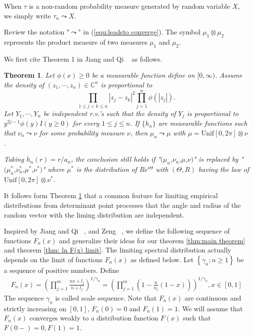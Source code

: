 \documentclass[12pt]{article}
\theoremstyle{plain}
\newtheorem{thm}{\textbf{Theorem}}
\theoremstyle{definition}
\theoremstyle{remark}
\begin{document}
When $\tau$ is a non-random probability measure generated by random variable $X$, we simply write $\tau_n\leadsto X$.

Review the notation "$\leadsto$" in (\ref{equ:leadsto converge}).
The symbol $\mu_1\otimes \mu_2$ represents the product measure of two measures $\mu_1$ and $\mu_2$.

We first cite Theorem 1 in Jiang and Qi ~\cite{JiangQi2019} as
follows.

\begin{thm}\label{thm:nonlinear}
Let $\phi(x)\geq 0$ be a measurable function define on $[0,\infty)$. Assume the density of $(z_1,\cdots,z_n)\in \mathbb{C}^n$ is proportional to $$\prod_{1\leq j<k\leq n} |z_j-z_k|^2\prod_{j=1}^n\phi (|z_j|).$$
Let $Y_1,\cdots,Y_n$ be independent r.v.'s such that the density of $Y_j$ is proportional to $y^{2j-1}\phi(y)I(y\geq 0)$ for every $1\leq j\leq n$. If $\{ h_n \}$ are measurable functions such that $\nu_n\leadsto \nu$ for some probability measure $\nu$, then $\mu_n\leadsto \mu$ with $\mu=\text{Unif}[0,2\pi]\otimes \nu$.

Taking $h_n(r)=r/a_n$, the conclusion still holds if "$(\mu_n$,$\nu_n$,$\mu$,$\nu)$" is replaced by "$(\mu_n^*$,$\nu_n^*$,$\mu^*$,$\nu^*)$" where $\mu^*$ is the distribution of $Re^{i\Theta}$ with $(\Theta,R)$ having the law of $\text{Unif}[0,2\pi]\otimes \nu^*$.
\end{thm}
It follows form Theorem \ref{thm:nonlinear} that a common feature for limiting empirical distributions from determinant point processes that the angle and radius of the random vector with the liming distribution are independent.

Inspired by Jiang and Qi ~\cite{JiangQi2019}, and Zeng
~\cite{zeng2016}, we define the following sequence of functions
$F_n(x)$ and generalize their ideas for our theorem \ref{thm:main
theorem} and theorem \ref{thm: ln F(x) limit}. The limiting spectral
distribution actually depends on the limit of functions $F_n(x)$ as
defined below. Let $\left\{\gamma_{n} ;  n \geq 1\right\}$ be a
sequence of positive numbers. Define
\begin{eqnarray*}
    F_{n}(x)=\left(\prod_{j=1}^{m} \frac{nx+l_{j} }{n+l_{j}}\right)^{1 / \gamma_{n}}=
    \left(\prod_{j=1}^{m} (1-\frac{n}{n_j}(1-x))\right) ^{1 / \gamma_{n}},  x \in[0,1]
\end{eqnarray*}
The sequence  $\gamma_{n}$ is called scale sequence.
Note that $F_n(x)$ are continuous and strictly increasing on $[0,1]$, $F_{n}(0)=0$ and $F_{n}(1)=1$. We will assume that $F_n(x)$ converges weakly to a distribution function $F(x)$ such that $F(0-)=0, F(1)=1$.
\end{document}
